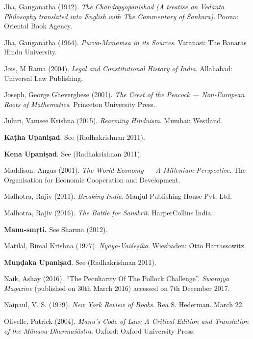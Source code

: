 \begin{thebibliography}{99}
Jha, Ganganatha (1942). {\sl The Chāndogyopanishad (A treatise on Vedānta Philosophy translated into English with The Commentary of Śankara)}. Poona: Oriental Book Agency.

Jha, Ganganatha (1964). {\sl Pūrva-Mīmāṁsā in its Sources}. Varanasi: The Banaras Hindu University.

Jois, M Rama (2004). {\sl Legal and Constitutional History of India}. Allahabad: Universal Law Publishing.

Joseph, George Gheverghese (2001). {\sl The Crest of the Peacock --- Non-European Roots of Mathematics}. Princeton University Press.

Juluri, Vamsee Krishna (2015). {\sl Rearming Hinduism}. Mumbai: Westland.

{\bf Kaṭha Upaniṣad}. See (Radhakrishnan 2011).

{\bf Kena Upaniṣad}. See (Radhakrishnan 2011).

Maddison, Angus (2001). {\sl The World Economy --- A Millenium Perspective}. The Organisation for Economic Cooperation and Development.

Malhotra, Rajiv (2011). {\sl Breaking India}. Manjul Publishing House Pvt. Ltd.

Malhotra, Rajiv (2016). {\sl The Battle for Sanskrit}. HarperCollins India.

{\bf Manu-smṛti.} See Sharma (2012).

Matilal, Bimal Krishna (1977). {\sl Nyāya-Vaiśeṣika}. Wiesbaden: Otto Harrassowitz.

{\bf Muṇḍaka Upaniṣad}. See (Radhakrishnan 2011).

Naik, Ashay (2016). ``The Peculiarity Of The Pollock Challenge''. {\sl Swarajya Magazine} 
(published on 30th March 2016) accessed on 7th December 2017.

Naipaul, V. S. (1979). {\sl New York Review of Books}. Rea S. Hederman. March 22.

Olivelle, Patrick (2004). {\sl Manu’s Code of Law: A Critical Edition and Translation of the Mānava-Dharmaśāstra}. Oxford: Oxford University Press.


\end{thebibliography}
